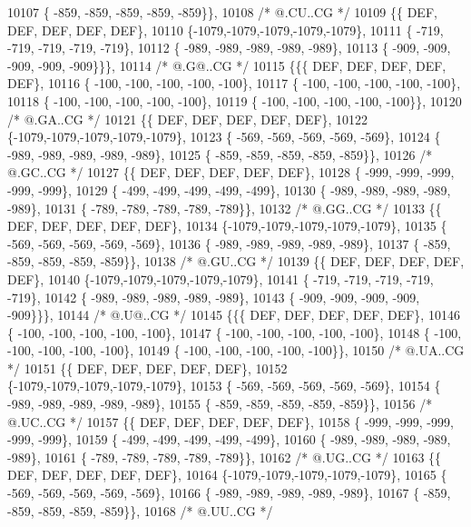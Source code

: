 \begin{DoxyCode}
10107 \{ -859, -859, -859, -859, -859\}\},
10108 \textcolor{comment}{/*  @.CU..CG */}
10109 \{\{  DEF,  DEF,  DEF,  DEF,  DEF\},
10110 \{-1079,-1079,-1079,-1079,-1079\},
10111 \{ -719, -719, -719, -719, -719\},
10112 \{ -989, -989, -989, -989, -989\},
10113 \{ -909, -909, -909, -909, -909\}\}\},
10114 \textcolor{comment}{/*  @.G@..CG */}
10115 \{\{\{  DEF,  DEF,  DEF,  DEF,  DEF\},
10116 \{ -100, -100, -100, -100, -100\},
10117 \{ -100, -100, -100, -100, -100\},
10118 \{ -100, -100, -100, -100, -100\},
10119 \{ -100, -100, -100, -100, -100\}\},
10120 \textcolor{comment}{/*  @.GA..CG */}
10121 \{\{  DEF,  DEF,  DEF,  DEF,  DEF\},
10122 \{-1079,-1079,-1079,-1079,-1079\},
10123 \{ -569, -569, -569, -569, -569\},
10124 \{ -989, -989, -989, -989, -989\},
10125 \{ -859, -859, -859, -859, -859\}\},
10126 \textcolor{comment}{/*  @.GC..CG */}
10127 \{\{  DEF,  DEF,  DEF,  DEF,  DEF\},
10128 \{ -999, -999, -999, -999, -999\},
10129 \{ -499, -499, -499, -499, -499\},
10130 \{ -989, -989, -989, -989, -989\},
10131 \{ -789, -789, -789, -789, -789\}\},
10132 \textcolor{comment}{/*  @.GG..CG */}
10133 \{\{  DEF,  DEF,  DEF,  DEF,  DEF\},
10134 \{-1079,-1079,-1079,-1079,-1079\},
10135 \{ -569, -569, -569, -569, -569\},
10136 \{ -989, -989, -989, -989, -989\},
10137 \{ -859, -859, -859, -859, -859\}\},
10138 \textcolor{comment}{/*  @.GU..CG */}
10139 \{\{  DEF,  DEF,  DEF,  DEF,  DEF\},
10140 \{-1079,-1079,-1079,-1079,-1079\},
10141 \{ -719, -719, -719, -719, -719\},
10142 \{ -989, -989, -989, -989, -989\},
10143 \{ -909, -909, -909, -909, -909\}\}\},
10144 \textcolor{comment}{/*  @.U@..CG */}
10145 \{\{\{  DEF,  DEF,  DEF,  DEF,  DEF\},
10146 \{ -100, -100, -100, -100, -100\},
10147 \{ -100, -100, -100, -100, -100\},
10148 \{ -100, -100, -100, -100, -100\},
10149 \{ -100, -100, -100, -100, -100\}\},
10150 \textcolor{comment}{/*  @.UA..CG */}
10151 \{\{  DEF,  DEF,  DEF,  DEF,  DEF\},
10152 \{-1079,-1079,-1079,-1079,-1079\},
10153 \{ -569, -569, -569, -569, -569\},
10154 \{ -989, -989, -989, -989, -989\},
10155 \{ -859, -859, -859, -859, -859\}\},
10156 \textcolor{comment}{/*  @.UC..CG */}
10157 \{\{  DEF,  DEF,  DEF,  DEF,  DEF\},
10158 \{ -999, -999, -999, -999, -999\},
10159 \{ -499, -499, -499, -499, -499\},
10160 \{ -989, -989, -989, -989, -989\},
10161 \{ -789, -789, -789, -789, -789\}\},
10162 \textcolor{comment}{/*  @.UG..CG */}
10163 \{\{  DEF,  DEF,  DEF,  DEF,  DEF\},
10164 \{-1079,-1079,-1079,-1079,-1079\},
10165 \{ -569, -569, -569, -569, -569\},
10166 \{ -989, -989, -989, -989, -989\},
10167 \{ -859, -859, -859, -859, -859\}\},
10168 \textcolor{comment}{/*  @.UU..CG */}

\end{DoxyCode}

